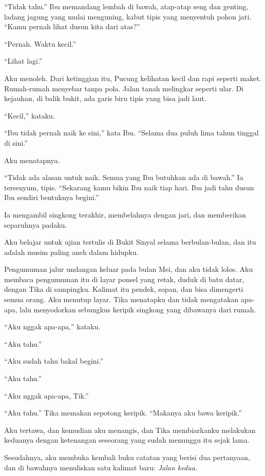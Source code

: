 \documentclass[11pt,twoside,openany]{book}
\makeatletter
\newcommand{\scenebreak}{\par\vspace{0.9em}{\centering\textsc{*\hspace{0.7em}*\hspace{0.7em}*}\par}\vspace{0.9em}\@afterindentfalse\@afterheading}
\makeatother
\begin{document}
``Tidak tahu.'' Ibu memandang lembah di bawah, atap-atap seng dan genting, ladang jagung yang mulai menguning, kabut tipis yang menyentuh pohon jati. ``Kamu pernah lihat dusun kita dari atas?''

``Pernah. Waktu kecil.''

``Lihat lagi.''

Aku menoleh. Dari ketinggian itu, Pucung kelihatan kecil dan rapi seperti maket. Rumah-rumah menyebar tanpa pola. Jalan tanah melingkar seperti ular. Di kejauhan, di balik bukit, ada garis biru tipis yang bisa jadi laut.

``Kecil,'' kataku.

``Ibu tidak pernah naik ke sini,'' kata Ibu. ``Selama dua puluh lima tahun tinggal di sini.''

Aku menatapnya.

``Tidak ada alasan untuk naik. Semua yang Ibu butuhkan ada di bawah.'' Ia tersenyum, tipis. ``Sekarang kamu bikin Ibu naik tiap hari. Ibu jadi tahu dusun Ibu sendiri bentuknya begini.''

Ia mengambil singkong terakhir, membelahnya dengan jari, dan memberikan separuhnya padaku.

\scenebreak
Aku belajar untuk ujian tertulis di Bukit Sinyal selama berbulan-bulan, dan itu adalah musim paling aneh dalam hidupku.

Pengumuman jalur undangan keluar pada bulan Mei, dan aku tidak lolos. Aku membaca pengumuman itu di layar ponsel yang retak, duduk di batu datar, dengan Tika di sampingku. Kalimat itu pendek, sopan, dan bisa dimengerti semua orang. Aku menutup layar. Tika menatapku dan tidak mengatakan apa-apa, lalu menyodorkan sebungkus keripik singkong yang dibawanya dari rumah.

``Aku nggak apa-apa,'' kataku.

``Aku tahu.''

``Aku sudah tahu bakal begini.''

``Aku tahu.''

``Aku nggak apa-apa, Tik.''

``Aku tahu.'' Tika memakan sepotong keripik. ``Makanya aku bawa keripik.''

Aku tertawa, dan kemudian aku menangis, dan Tika membiarkanku melakukan keduanya dengan ketenangan seseorang yang sudah menunggu itu sejak lama.

Sesudahnya, aku membuka kembali buku catatan yang berisi dua pertanyaan, dan di bawahnya menuliskan satu kalimat baru: \emph{Jalan kedua.}
\end{document}
